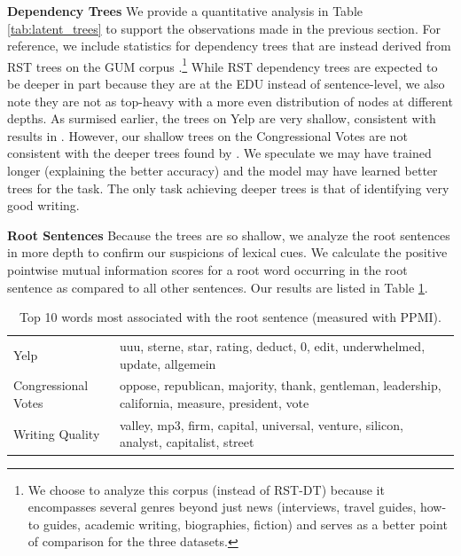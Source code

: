 \smallskip
\noindent\textbf{Dependency Trees} We provide a quantitative analysis in Table \ref{tab:latent_trees} to support the observations made in the previous section. For reference, we include statistics for dependency trees that are instead derived from RST trees on the GUM corpus \cite{Zeldes:2017}.\footnote{We choose to analyze this corpus (instead of RST-DT) because it encompasses several genres beyond just news (interviews, travel guides, how-to guides, academic writing, biographies, fiction) and serves as a better point of comparison for the three datasets.} While RST dependency trees are expected to be deeper in part because they are at the EDU instead of sentence-level, we also note they are not as top-heavy with a more even distribution of nodes at different depths. As surmised earlier, the trees on Yelp are very shallow, consistent with results in . However, our shallow trees on the Congressional Votes are not consistent with the deeper trees found by . We speculate we may have trained longer (explaining the better accuracy) and the model may have learned better trees for the task. The only task achieving deeper trees is that of identifying very good writing.  

\smallskip
\noindent\textbf{Root Sentences} Because the trees are so shallow, we analyze the root sentences in more depth to confirm our suspicions of lexical cues. We calculate the positive pointwise mutual information scores for a root word occurring in the root sentence as compared to all other sentences. Our results are listed in Table \ref{tab:latent_ppmi}.
\begin{table}[h!]
     \begin{center}
     \begin{tabular}{lp{10cm}}
\toprule
Yelp                & uuu, sterne, star, rating, deduct, 0, edit, underwhelmed, update, allgemein \\ 
Congressional Votes & oppose, republican, majority, thank, gentleman, leadership, california, measure, president, vote    \\ 
Writing Quality     & valley, mp3, firm, capital, universal, venture, silicon, analyst, capitalist, street        \\ \bottomrule
\end{tabular}
\caption{Top 10 words most associated with the root sentence (measured with PPMI).}
      \label{tab:latent_ppmi}
      \end{center}
      \end{table}
      
